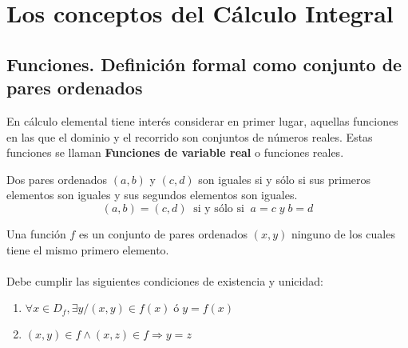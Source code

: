 \setcounter{chapter}{0}
\chapter{Los conceptos del Cálculo Integral}

\setcounter{chapter}{1}
\setcounter{section}{2}

\section{Funciones. Definición formal como conjunto de pares ordenados}
En cálculo elemental tiene interés considerar en primer lugar, aquellas funciones en las que el dominio y el recorrido son conjuntos de números reales. Estas funciones se llaman 
\textbf{Funciones de variable real} o funciones reales.\\

    \begin{tcolorbox}
        \begin{def.}
            Dos pares ordenados $(a,b)$ y $(c,d)$ son iguales si y sólo si sus primeros elementos son iguales y sus segundos elementos son iguales.
            $$(a,b) = (c,d) \; \; \mbox{si y sólo si} \; \; a=c \; y \; b=d$$
        \end{def.}
    \end{tcolorbox}

    \begin{tcolorbox}
        \begin{def.}
            Una función $f$ es un conjunto de pares ordenados $(x,y)$ ninguno de los cuales tiene el mismo primero elemento.\\\\
            Debe cumplir las siguientes condiciones de existencia y unicidad:
            \begin{enumerate}[\bfseries (i)]
                \item $\forall x \in D_f, \exists y / (x,y) \in f(x) \; ó \; y=f(x)$
                \item $(x,y) \in  f \land (x,z) \in  f \Rightarrow y = z$
            \end{enumerate}
        \end{def.}
    \end{tcolorbox}

